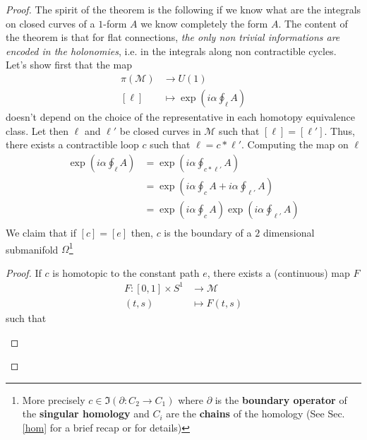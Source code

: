 \begin{proof}
The spirit of the theorem is the following if we know what are the integrals on closed curves of a $1$-form $A$ we know completely the form $A$. The content of the theorem  is that for flat connections, \textit{the only non trivial informations are encoded in the holonomies}, i.e. in the integrals along non contractible cycles. \\
Let's show first that the map
\begin{equation}
    \begin{aligned}
 \pi(\mathcal{M}) &\to U(1)\\
 [\ell] &\mapsto \exp(i \alpha \oint_{\ell} A)
    \end{aligned}
\end{equation}
doesn't depend on the choice of the representative in each homotopy equivalence class. Let then $\ell$ and $\ell'$ be closed curves in $\mathcal{M}$ such that $[\ell] = [\ell']$. Thus, there exists a contractible loop $c$ such that $\ell = c * \ell'$. Computing the map on $\ell$
\begin{equation}
    \begin{aligned}
        \exp(i \alpha \oint_{\ell} A) &=   \exp(i \alpha \oint_{c * \ell'} A)\\
        &= \exp(i \alpha \oint_{c } A + i \alpha\oint_{\ell'} A)\\
        &= \exp(i \alpha \oint_{c } A) \exp(i \alpha\oint_{\ell'} A)\\  
    \end{aligned}
\end{equation}
We claim that if $[c]=[e]$ then, $c$ is the boundary of a $2$ dimensional submanifold $\Omega$\footnote{More precisely $c \in \Im (\partial: C_2 \to C_1)$ where $\partial$ is the \textbf{boundary operator} of the \textbf{singular homology} and $C_i$ are the \textbf{chains} of the homology (See Sec. \ref{hom} for a brief recap or \cite[Section 2.1]{Hat} for details)}
\begin{proof}
    If $c$ is homotopic to the constant path $e$, there exists a (continuous) map $F$
    \begin{equation}
    \begin{aligned}
        F: [0,1] \times S^1 &\to \mathcal{M}\\
            (t,s) &\mapsto F(t,s)
        \end{aligned}
    \end{equation}
    such that
    \begin{enumerate}

\end{enumerate}
\end{proof}
\end{proof}
